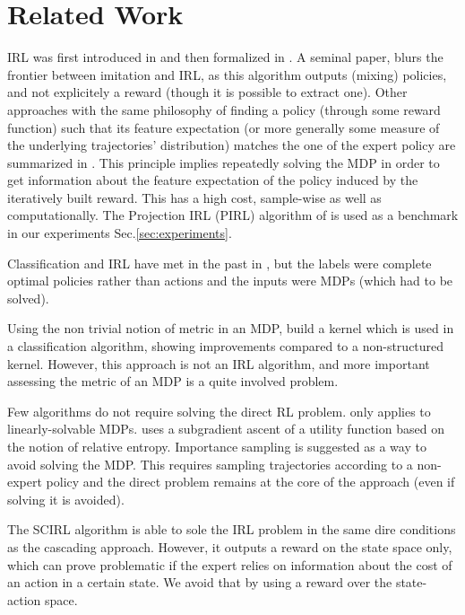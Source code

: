 \documentclass[smallextended]{svjour3}
\begin{document}
\section{Related Work}
\label{sec:related}
IRL was first introduced in \cite{russell1998learning} and then formalized in \cite{ng2000algorithms}. A seminal paper, \cite{abbeel2004apprenticeship} blurs the frontier between imitation and IRL, as this algorithm outputs (mixing) policies, and not explicitely a reward (though it is possible to extract one). Other approaches with the same philosophy of finding a policy
(through some reward function) such that its feature expectation (or
more generally some measure of the underlying trajectories'
distribution) matches the one of the expert policy are summarized in \cite{neu2009training}. This principle implies repeatedly solving the MDP in order to get information about the feature expectation of the policy induced by the iteratively built reward. This has a high cost, sample-wise as well as computationally. The Projection IRL (PIRL) algorithm of \cite{abbeel2004apprenticeship} is used as a benchmark in our experiments Sec.\ref{sec:experiments}.

Classification and IRL have met in the past in \cite{ratliff2006maximum}, but the labels were complete optimal policies rather than actions and the inputs were MDPs (which had to be solved).

Using the non trivial notion of metric in an MDP, \cite{melo2010learning} build a kernel which is used
in a classification algorithm, showing improvements compared to a
non-structured kernel. However, this approach is not an IRL
algorithm, and more important assessing the metric of an MDP is a
quite involved problem.


Few algorithms do not require solving the direct RL problem. \cite{Dvij:2010} only applies to linearly-solvable MDPs.
\cite{boularias:2011} uses a subgradient ascent of a utility function based on the notion of relative entropy. Importance sampling is suggested as a way to avoid solving the MDP. This requires sampling trajectories according to a non-expert policy and
the direct problem remains at the core of the approach (even if
solving it is avoided).

The SCIRL algorithm \cite{klein2012scirl} is able to sole the IRL problem in the same dire conditions as the cascading approach. However, it outputs a reward on the state space only, which can prove problematic if the expert relies on information about the cost of an action in a certain state. We avoid that by using a reward over the state-action space.
\end{document}
